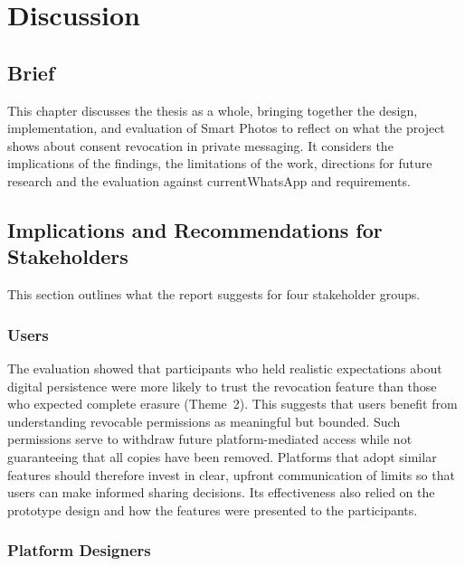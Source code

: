 \chapter{Discussion}

\section{Brief}
This chapter discusses the thesis as a whole, bringing together the design, implementation, and evaluation of Smart Photos to reflect on what the project shows about consent revocation in private messaging. It considers the implications of the findings, the limitations of the work, directions for future research and the evaluation against currentWhatsApp and requirements.

\section{Implications and Recommendations for Stakeholders}

This section outlines what the report suggests for four stakeholder groups.

\subsection*{Users}

The evaluation showed that participants who held realistic expectations about digital persistence were more likely to trust the revocation feature than those who expected complete erasure (Theme~2). This suggests that users benefit from understanding revocable permissions as meaningful but bounded. Such permissions serve to withdraw future platform-mediated access while not guaranteeing that all copies have been removed. Platforms that adopt similar features should therefore invest in clear, upfront communication of limits so that users can make informed sharing decisions. Its effectiveness also relied on the prototype design and how the features were presented to the participants.

\subsection*{Platform Designers}

